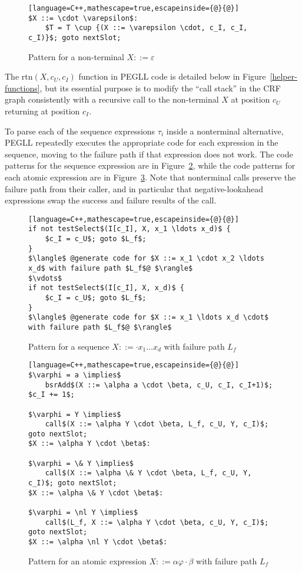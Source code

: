 \documentclass{article}
\newcommand{\nl}{\mathord{!}}
\begin{document}
\begin{figure}
\caption[Empty non-terminal code pattern]{Pattern for a non-terminal $X ::= \varepsilon$} \label{empty-nt-pattern}
\begin{lstlisting}[language=C++,mathescape=true,escapeinside={@}{@}]
$X ::= \cdot \varepsilon$:
	$T = T \cup {(X ::= \varepsilon \cdot, c_I, c_I, c_I)}$; goto nextSlot;
\end{lstlisting}
\end{figure}

The rtn$(X, c_U, c_I)$ function in PEGLL code is detailed below in Figure~\ref{helper-functions}, but its essential purpose is to modify the ``call stack'' in the CRF graph consistently with a recursive call to the non-terminal $X$ at position $c_U$ returning at position $c_I$.

To parse each of the sequence expressions $\tau_i$ inside a nonterminal alternative, PEGLL repeatedly executes the appropriate code for each expression in the sequence, moving to the failure path if that expression does not work. 
The code patterns for the sequence expression are in Figure~\ref{seq-expr-pattern}, while the code patterns for each atomic expression are in Figure~\ref{atom-expr-pattern}. 
Note that nonterminal calls preserve the failure path from their caller, and in particular that negative-lookahead expressions swap the success and failure results of the call.

\begin{figure}
\caption[Sequence expression code pattern]{Pattern for a sequence $X ::= \cdot x_1 \ldots x_d$ with failure path $L_f$} \label{seq-expr-pattern}
\begin{lstlisting}[language=C++,mathescape=true,escapeinside={@}{@}]
if not testSelect$(I[c_I], X, x_1 \ldots x_d)$ {
	$c_I = c_U$; goto $L_f$;
}
$\langle$ @generate code for $X ::= x_1 \cdot x_2 \ldots x_d$ with failure path $L_f$@ $\rangle$
$\vdots$
if not testSelect$(I[c_I], X, x_d)$ {
	$c_I = c_U$; goto $L_f$;
}
$\langle$ @generate code for $X ::= x_1 \ldots x_d \cdot$ with failure path $L_f$@ $\rangle$
\end{lstlisting}
\end{figure}

\begin{figure}
\caption[Atomic expression code patterns]{Pattern for an atomic expression $X ::= \alpha \varphi \cdot \beta$ with failure path $L_f$} \label{atom-expr-pattern}
\begin{lstlisting}[language=C++,mathescape=true,escapeinside={@}{@}]
$\varphi = a \implies$
	bsrAdd$(X ::= \alpha a \cdot \beta, c_U, c_I, c_I+1)$; $c_I += 1$;

$\varphi = Y \implies$
	call$(X ::= \alpha Y \cdot \beta, L_f, c_U, Y, c_I)$; goto nextSlot;
$X ::= \alpha Y \cdot \beta$:

$\varphi = \& Y \implies$
	call$(X ::= \alpha \& Y \cdot \beta, L_f, c_U, Y, c_I)$; goto nextSlot;
$X ::= \alpha \& Y \cdot \beta$:

$\varphi = \nl Y \implies$
	call$(L_f, X ::= \alpha Y \cdot \beta, c_U, Y, c_I)$; goto nextSlot;
$X ::= \alpha \nl Y \cdot \beta$:
\end{lstlisting}
\end{figure}
\end{document}
